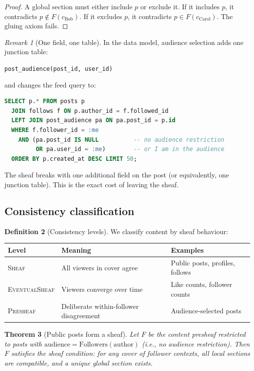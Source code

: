 \documentclass[11pt,a4paper]{article}
\theoremstyle{definition}
\newtheorem{definition}{Definition}[section]
\theoremstyle{plain}
\newtheorem{theorem}[definition]{Theorem}
\theoremstyle{remark}
\newtheorem{remark}[definition]{Remark}
\begin{document}
\begin{proof}
A global section must either include $p$ or exclude it. If it
includes $p$, it contradicts $p \notin F(c_{\text{Bob}})$. If it
excludes $p$, it contradicts $p \in F(c_{\text{Carol}})$. The gluing
axiom fails.
\end{proof}

\begin{remark}[One field, one table]
In the data model, audience selection adds one junction table:
\begin{center}
\texttt{post\_audience(post\_id, user\_id)}
\end{center}
and changes the feed query to:
\begin{lstlisting}[language=SQL,basicstyle=\ttfamily\small]
SELECT p.* FROM posts p
  JOIN follows f ON p.author_id = f.followed_id
  LEFT JOIN post_audience pa ON pa.post_id = p.id
  WHERE f.follower_id = :me
    AND (pa.post_id IS NULL          -- no audience restriction
         OR pa.user_id = :me)        -- or I am in the audience
  ORDER BY p.created_at DESC LIMIT 50;
\end{lstlisting}
The sheaf breaks with one additional field on the post (or
equivalently, one junction table). This is the exact cost of leaving
the sheaf.
\end{remark}

\subsection{Consistency classification}

\begin{definition}[Consistency levels]\label{def:consistency}
We classify content by sheaf behaviour:
\begin{center}
\begin{tabular}{@{}lll@{}}
\toprule
\textbf{Level} & \textbf{Meaning} & \textbf{Examples} \\
\midrule
\textsc{Sheaf} & All viewers in cover agree & Public posts, profiles, follows \\
\textsc{EventualSheaf} & Viewers converge over time & Like counts, follower counts \\
\textsc{Presheaf} & Deliberate within-follower disagreement & Audience-selected posts \\
\bottomrule
\end{tabular}
\end{center}
\end{definition}

\begin{theorem}[Public posts form a sheaf]\label{thm:public-sheaf}
Let $F$ be the content presheaf restricted to posts with
$\mathrm{audience} = \mathrm{Followers}(\mathrm{author})$ (i.e., no
audience restriction). Then $F$ satisfies the sheaf condition: for
any cover of follower contexts, all local sections are compatible,
and a unique global section exists.
\end{theorem}
\end{document}
